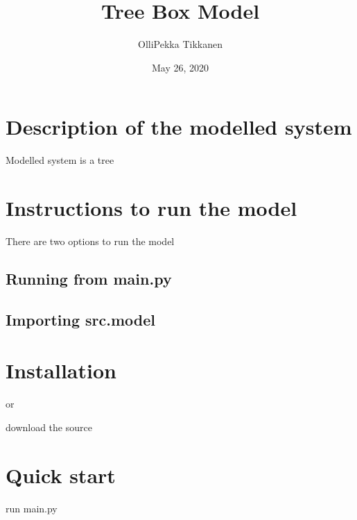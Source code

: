 \documentclass[letterpaper,10pt,english]{sphinxmanual}
\title{Tree Box Model}
\date{May 26, 2020}
\author{Olli\sphinxhyphen{}Pekka Tikkanen}
\begin{document}
\pagestyle{empty}
\sphinxmaketitle
\pagestyle{plain}
\sphinxtableofcontents
\pagestyle{normal}
\label{\detokenize{index::doc}}



\chapter{Description of the modelled system}
\label{\detokenize{modelled_system:description-of-the-modelled-system}}\label{\detokenize{modelled_system::doc}}
Modelled system is a tree


\chapter{Instructions to run the model}
\label{\detokenize{instructions_to_run:instructions-to-run-the-model}}\label{\detokenize{instructions_to_run::doc}}
There are two options to run the model


\section{Running from main.py}
\label{\detokenize{instructions_to_run:running-from-main-py}}

\section{Importing src.model}
\label{\detokenize{instructions_to_run:importing-src-model}}

\chapter{Installation}
\label{\detokenize{index:installation}}
\begin{sphinxVerbatim}[commandchars=\\\{\}]
  
\end{sphinxVerbatim}

or

download the source 


\chapter{Quick start}
\label{\detokenize{index:quick-start}}
run main.py
\end{document}
